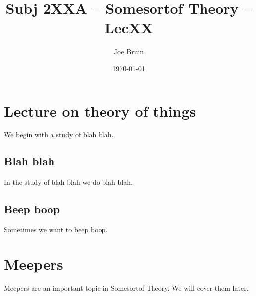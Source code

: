 \documentclass[12pt]{article} %
\title{Subj 2XXA -- Somesortof Theory -- LecXX}
\author{Joe Bruin}
\date{\today} %
\begin{document}
\maketitle


\section{Lecture on theory of things}

We begin with a study of blah blah. 


\subsection{Blah blah}

In the study of blah blah we do blah blah. 


\subsection{Beep boop}

Sometimes we want to beep boop. 


\section{Meepers}

Meepers are an important topic in Somesortof Theory. We will cover them later. 


\end{document}
